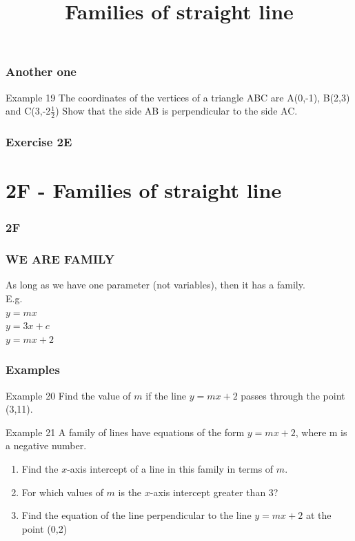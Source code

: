 \documentclass{beamer}
\newcommand{\blank}{\begin{frame}
\end{frame}}
\begin{document}
\begin{frame}[t]
    \frametitle{Another one}
    \begin{block}{Example 19}
        The coordinates of the vertices of a triangle ABC are A(0,-1), B(2,3) and C(3,-2$\frac{1}{2}$)
        Show that the side AB is perpendicular to the side AC.
    \end{block}
\end{frame}
\blank

\begin{frame}
    \frametitle{Exercise 2E}
\end{frame}

\section{2F - Families of straight line}
\begin{frame}
    \frametitle{2F}
    \begin{center}
        \title{Families of straight line}
        \maketitle
    \end{center}
\end{frame}

\begin{frame}
    \frametitle{WE ARE FAMILY}
    As long as we have one parameter (not variables), then it has a family.\\
    E.g.\\
    $y=mx$\\
    $y = 3x + c$\\
    $y = mx + 2$
\end{frame}

\begin{frame}
    \frametitle{Examples}
    \begin{block}{Example 20}
        Find the value of $m$ if the line $y = mx + 2$ passes through the point (3,11).
    \end{block}
    \begin{block}{Example 21}
        A family of lines have equations of the form $y = mx + 2$, where m is a negative number.
        \begin{enumerate}
            \item  Find the $x$-axis intercept of a line in this family in terms of $m$.
            \item For which values of $m$ is the $x$-axis intercept greater than 3?
            \item  Find the equation of the line perpendicular to the line $y = mx + 2$ at the point (0,2)
        \end{enumerate}
    \end{block}
\end{frame}
\end{document}
